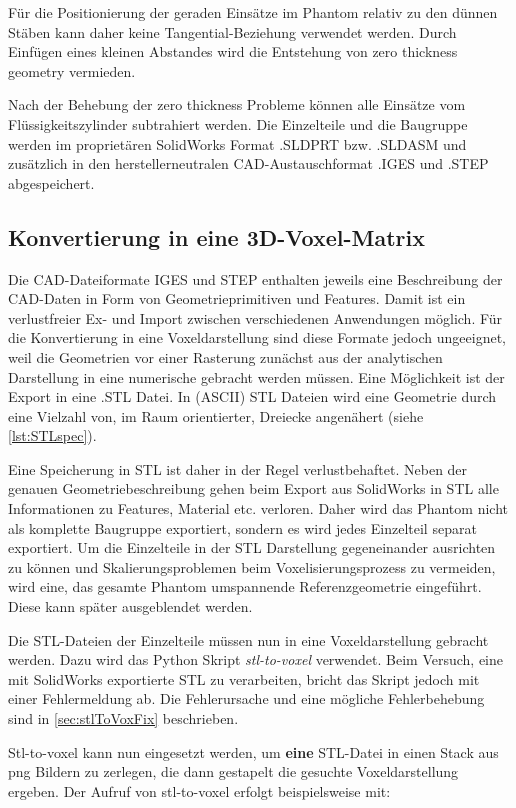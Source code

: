 Für die Positionierung der geraden Einsätze im Phantom relativ zu den dünnen Stäben kann daher keine Tangential-Beziehung verwendet werden. Durch Einfügen eines kleinen Abstandes wird die Entstehung von zero thickness geometry vermieden.

Nach der Behebung der zero thickness Probleme können alle Einsätze vom Flüssigkeitszylinder subtrahiert werden. Die Einzelteile und die Baugruppe werden im proprietären SolidWorks Format .SLDPRT bzw. .SLDASM und zusätzlich in den herstellerneutralen CAD-Austauschformat .IGES und .STEP abgespeichert.

\subsection{Konvertierung in eine 3D-Voxel-Matrix}
Die CAD-Dateiformate IGES und STEP enthalten jeweils eine Beschreibung der CAD-Daten in Form von Geometrieprimitiven und Features. Damit ist ein verlustfreier Ex- und Import zwischen verschiedenen Anwendungen möglich. Für die Konvertierung in eine Voxeldarstellung sind diese Formate jedoch ungeeignet, weil die Geometrien vor einer Rasterung zunächst aus der analytischen Darstellung in eine numerische gebracht werden müssen. Eine Möglichkeit ist der Export in eine .STL Datei. In (ASCII) STL Dateien wird eine Geometrie durch eine Vielzahl von, im Raum orientierter, Dreiecke angenähert (siehe \autoref{lst:STLspec}).

Eine Speicherung in STL ist daher in der Regel verlustbehaftet. Neben der genauen Geometriebeschreibung gehen beim Export aus SolidWorks in STL alle Informationen zu Features, Material etc. verloren. Daher wird das Phantom nicht als komplette Baugruppe exportiert, sondern es wird jedes Einzelteil separat exportiert. Um die Einzelteile in der STL Darstellung gegeneinander ausrichten zu können und Skalierungsproblemen beim Voxelisierungsprozess zu vermeiden, wird eine, das gesamte Phantom umspannende Referenzgeometrie eingeführt. Diese kann später ausgeblendet werden.

Die STL-Dateien der Einzelteile müssen nun in eine Voxeldarstellung gebracht werden. Dazu wird das Python Skript \textit{stl-to-voxel} \cite{stlToVox} verwendet. Beim Versuch, eine mit SolidWorks exportierte STL zu verarbeiten, bricht das Skript jedoch mit einer Fehlermeldung ab. Die Fehlerursache und eine mögliche Fehlerbehebung sind in \autoref{sec:stlToVoxFix} beschrieben.

Stl-to-voxel kann nun eingesetzt werden, um \textbf{eine} STL-Datei in einen Stack aus png Bildern zu zerlegen, die dann gestapelt die gesuchte Voxeldarstellung ergeben.
Der Aufruf von stl-to-voxel erfolgt beispielsweise mit:

